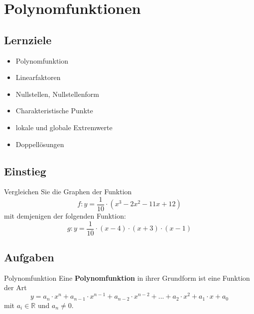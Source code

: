 
\section{Polynomfunktionen}

\subsection*{Lernziele}

\begin{itemize}
\item Polynomfunktion
\item Linearfaktoren
\item Nullstellen, Nullstellenform
\item Charakteristische Punkte
\item lokale und globale Extremwerte
\item Doppellösungen
\end{itemize}

\newpage


\subsection{Einstieg}
Vergleichen Sie die Graphen der Funktion
$$f: y= \frac1{10}\cdot{}(x^3-2x^2-11x+12)$$
mit demjenigen der folgenden Funktion:
$$g: y=\frac1{10}\cdot{}(x-4)\cdot{}(x+3)\cdot{}(x-1)$$



\subsection*{Aufgaben}

\newpage
\begin{definition}{Polynomfunktion}{}
  Eine \textbf{Polynomfunktion} in ihrer Grundform ist eine Funktion
  der Art
  $$y = a_n\cdot{}x^n + a_{n-1}\cdot{}x^{n-1} + a_{n-2}\cdot{}x^{n-2}
  + ... + a_2\cdot{}x^2 + a_1\cdot{}x + a_0$$
  mit $a_i\in \mathbb{R}$ und $a_n\ne 0$.
\end{definition}

